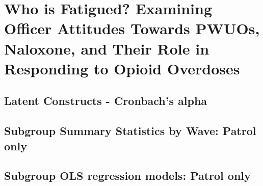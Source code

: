 \chapter{Who is Fatigued? Examining Officer Attitudes Towards PWUOs, Naloxone, and Their Role in Responding to Opioid Overdoses}
\section{Latent Constructs - Cronbach's alpha}

\section{Subgroup Summary Statistics by Wave: Patrol only}
\begin{landscape}

\end{landscape}

\section{Subgroup OLS regression models: Patrol only}
\begin{landscape}

\end{landscape}